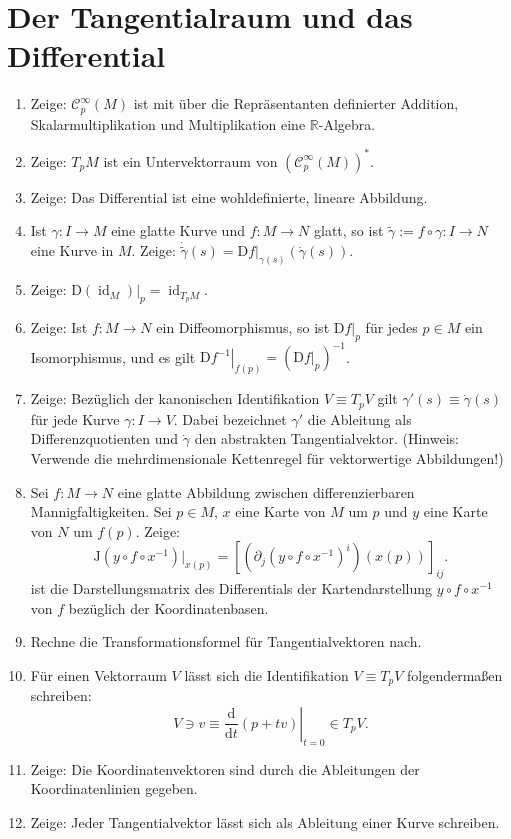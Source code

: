 \documentclass[a4paper]{scrartcl}
\newcommand{\D}{\mathrm{d}}
\newcommand{\DD}{\mathrm{D}}
\DeclareMathOperator{\id}{id}
\newcommand{\sC}{\mathcal{C}^{\infty}}
\begin{document}
	\section{Der Tangentialraum und das Differential}
	\begin{enumerate}
		\item Zeige: $\sC_p(M)$ ist mit über die Repräsentanten definierter Addition, Skalarmultiplikation und Multiplikation eine $\mathbb R$-Algebra.
		\item Zeige: $T_pM$ ist ein Untervektorraum von $(\sC_p(M))^*$.
		\item Zeige: Das Differential ist eine wohldefinierte, lineare Abbildung.
		\item Ist $\gamma\colon I \to M$ eine glatte Kurve und $f\colon M \to N$ glatt, so ist $\tilde\gamma := f\circ\gamma \colon I \to N$ eine Kurve in $M$. Zeige: $\dot{\tilde\gamma}(s) = \left.\DD f\right|_{\gamma(s)} (\dot\gamma(s))$.
		\item Zeige: $\left.\DD(\id_M)\right|_p = \id_{T_pM}$.
		\item Zeige: Ist $f\colon M \to N$ ein Diffeomorphismus, so ist $\left.\DD f\right|_p$ für jedes $p\in M$ ein Isomorphismus, und es gilt $\left.\DD f^{-1}\right|_{f(p)} = \left(\left.\DD f\right|_p\right)^{-1}$.
		\item Zeige: Bezüglich der kanonischen Identifikation $V\equiv T_pV$ gilt $\gamma'(s) \equiv \dot\gamma(s)$ für jede Kurve $\gamma\colon I\rightarrow V$. Dabei bezeichnet $\gamma'$ die Ableitung als Differenzquotienten und $\dot{\gamma}$ den abstrakten Tangentialvektor. (Hinweis: Verwende die mehrdimensionale Kettenregel für vektorwertige Abbildungen!)
		\item Sei $f\colon M \to N$ eine glatte Abbildung zwischen differenzierbaren Mannigfaltigkeiten. Sei $p\in M$, $x$ eine Karte von $M$ um $p$ und $y$ eine Karte von $N$ um $f(p)$. Zeige: \[\mathrm{J}(y\circ f\circ x^{-1})|_{x(p)} = \left[\left(\partial_j(y\circ f\circ x^{-1})^i\right) (x(p)) \right]_{ij}.\]
		ist die Darstellungsmatrix des Differentials der Kartendarstellung $y\circ f\circ x^{-1}$ von $f$ bezüglich der Koordinatenbasen.
		\item Rechne die Transformationsformel für Tangentialvektoren nach.
		\item Für einen Vektorraum $V$ lässt sich die Identifikation $V\equiv T_pV$ folgendermaßen schreiben: 
		\[V \ni v \equiv \left.\frac{\D}{\D t}(p + tv)\right|_{t=0} \in T_pV.\]
		\item Zeige: Die Koordinatenvektoren sind durch die Ableitungen der Koordinatenlinien gegeben.
		\item Zeige: Jeder Tangentialvektor lässt sich als Ableitung einer Kurve schreiben.
	\end{enumerate}
\end{document}
